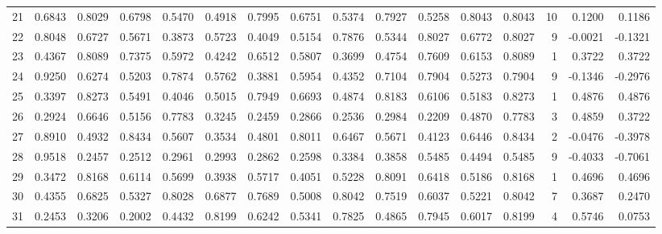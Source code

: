 \begin{tabular}{lrrrrrrrrrrrrrrr}
21  &      0.6843 &  0.8029 &  0.6798 &  0.5470 &  0.4918 &  0.7995 &  0.6751 &  0.5374 &  0.7927 &  0.5258 &   0.8043 &     0.8043 &     10 &                    0.1200 &                     0.1186 \\
22  &      0.8048 &  0.6727 &  0.5671 &  0.3873 &  0.5723 &  0.4049 &  0.5154 &  0.7876 &  0.5344 &  0.8027 &   0.6772 &     0.8027 &      9 &                   -0.0021 &                    -0.1321 \\
23  &      0.4367 &  0.8089 &  0.7375 &  0.5972 &  0.4242 &  0.6512 &  0.5807 &  0.3699 &  0.4754 &  0.7609 &   0.6153 &     0.8089 &      1 &                    0.3722 &                     0.3722 \\
24  &      0.9250 &  0.6274 &  0.5203 &  0.7874 &  0.5762 &  0.3881 &  0.5954 &  0.4352 &  0.7104 &  0.7904 &   0.5273 &     0.7904 &      9 &                   -0.1346 &                    -0.2976 \\
25  &      0.3397 &  0.8273 &  0.5491 &  0.4046 &  0.5015 &  0.7949 &  0.6693 &  0.4874 &  0.8183 &  0.6106 &   0.5183 &     0.8273 &      1 &                    0.4876 &                     0.4876 \\
26  &      0.2924 &  0.6646 &  0.5156 &  0.7783 &  0.3245 &  0.2459 &  0.2866 &  0.2536 &  0.2984 &  0.2209 &   0.4870 &     0.7783 &      3 &                    0.4859 &                     0.3722 \\
27  &      0.8910 &  0.4932 &  0.8434 &  0.5607 &  0.3534 &  0.4801 &  0.8011 &  0.6467 &  0.5671 &  0.4123 &   0.6446 &     0.8434 &      2 &                   -0.0476 &                    -0.3978 \\
28  &      0.9518 &  0.2457 &  0.2512 &  0.2961 &  0.2993 &  0.2862 &  0.2598 &  0.3384 &  0.3858 &  0.5485 &   0.4494 &     0.5485 &      9 &                   -0.4033 &                    -0.7061 \\
29  &      0.3472 &  0.8168 &  0.6114 &  0.5699 &  0.3938 &  0.5717 &  0.4051 &  0.5228 &  0.8091 &  0.6418 &   0.5186 &     0.8168 &      1 &                    0.4696 &                     0.4696 \\
30  &      0.4355 &  0.6825 &  0.5327 &  0.8028 &  0.6877 &  0.7689 &  0.5008 &  0.8042 &  0.7519 &  0.6037 &   0.5221 &     0.8042 &      7 &                    0.3687 &                     0.2470 \\
31  &      0.2453 &  0.3206 &  0.2002 &  0.4432 &  0.8199 &  0.6242 &  0.5341 &  0.7825 &  0.4865 &  0.7945 &   0.6017 &     0.8199 &      4 &                    0.5746 &                     0.0753 \\

\end{tabular}
